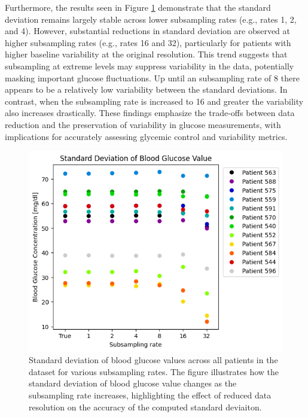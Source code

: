 Furthermore, the results seen in Figure \ref{fig:patients_std} demonstrate that the standard deviation remains largely stable across lower subsampling rates (e.g., rates 1, 2, and 4). However, substantial reductions in standard deviation are observed at higher subsampling rates (e.g., rates 16 and 32), particularly for patients with higher baseline variability at the original resolution. This trend suggests that subsampling at extreme levels may suppress variability in the data, potentially masking important glucose fluctuations.
Up until an subsampling rate of 8 there appears to be a relatively low variability between the standard deviations.  In contrast, when the subsampling rate is increased to 16 and greater the  variability also increases drastically. These findings emphasize the trade-offs between data reduction and the preservation of variability in glucose measurements, with implications for accurately assessing glycemic control and variability metrics.
\begin{figure}[h] %
	\centering
	\includegraphics[width=\linewidth]{Figures/all_patients_std_cbg_values.png} %
	\caption{Standard deviation of blood glucose values across all patients in the dataset for various subsampling rates. The figure illustrates how the standard deviation of blood glucose value changes as the subsampling rate increases, highlighting the effect of reduced data resolution on the accuracy of the computed standard deviaiton.}
	\label{fig:patients_std}  %
\end{figure}

